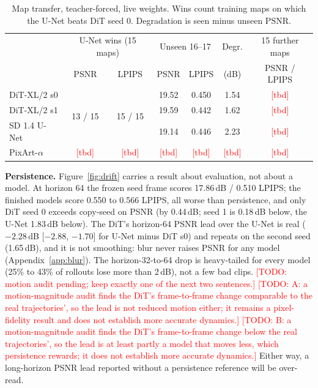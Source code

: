 \documentclass[10pt]{article}
\newcommand{\todo}[1]{\textcolor{red}{[TODO: #1]}}
\newcommand{\tbd}{\textcolor{red}{[tbd]}}  %
\begin{document}
\begin{table}[t]\centering\footnotesize
\caption{Map transfer, teacher-forced, live weights. Wins count training maps on which the U-Net beats DiT seed 0. Degradation is seen minus unseen PSNR.}\label{tab:transfer}
\begin{tabular}{lcccccc}\toprule
 & \multicolumn{2}{c}{U-Net wins (15 maps)} & \multicolumn{2}{c}{Unseen 16--17} & Degr. & 15 further maps \\
 & PSNR & LPIPS & PSNR & LPIPS & (dB) & PSNR / LPIPS \\\midrule
DiT-XL/2 s0 & \multirow{3}{*}{13 / 15} & \multirow{3}{*}{15 / 15} & 19.52 & 0.450 & 1.54 & \tbd \\
DiT-XL/2 s1 & & & 19.59 & 0.442 & 1.62 & \tbd \\
SD 1.4 U-Net & & & 19.14 & 0.446 & 2.23 & \tbd \\
PixArt-$\alpha$ & \tbd & \tbd & \tbd & \tbd & \tbd & \tbd \\\bottomrule
\end{tabular}
\end{table}

\textbf{Persistence.} Figure~\ref{fig:drift} carries a result about evaluation, not about a model. At horizon 64 the frozen seed frame scores 17.86\,dB / 0.510 LPIPS; the finished models score 0.550 to 0.566 LPIPS, all worse than persistence, and only DiT seed 0 exceeds copy-seed on PSNR (by 0.44\,dB; seed 1 is 0.18\,dB below, the U-Net 1.83\,dB below). The DiT's horizon-64 PSNR lead over the U-Net is real ($-2.28$\,dB [$-2.88$, $-1.70$] for U-Net minus DiT s0) and repeats on the second seed (1.65\,dB), and it is not smoothing: blur never raises PSNR for any model (Appendix~\ref{app:blur}). The horizon-32-to-64 drop is heavy-tailed for every model (25\% to 43\% of rollouts lose more than 2\,dB), not a few bad clips. \todo{motion audit pending; keep exactly one of the next two sentences.} \todo{A: a motion-magnitude audit finds the DiT's frame-to-frame change comparable to the real trajectories', so the lead is not reduced motion either; it remains a pixel-fidelity result and does not establish more accurate dynamics.} \todo{B: a motion-magnitude audit finds the DiT's frame-to-frame change below the real trajectories', so the lead is at least partly a model that moves less, which persistence rewards; it does not establish more accurate dynamics.} Either way, a long-horizon PSNR lead reported without a persistence reference will be over-read.
\end{document}
